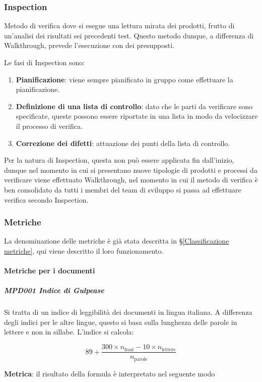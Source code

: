 		\subsubsection{Inspection}
		Metodo di verifica dove si esegue una lettura mirata dei prodotti, frutto di un'analisi dei risultati sei precedenti test. Questo metodo dunque, a differenza di Walkthrough, prevede l'esecuzione con dei presupposti.

		Le fasi di Inspection sono:

		\begin{enumerate}
			\item \textbf{Pianificazione}: viene sempre pianificato in gruppo come effettuare la pianificazione.
			\item \textbf{Definizione di una lista di controllo}: dato che le parti da verificare sono specificate, queste possono essere riportate in una lista in modo da velocizzare il processo di verifica.
			\item \textbf{Correzione dei difetti}: attuazione dei punti della lista di controllo.
		\end{enumerate}

	Per la natura di Inspection, questa non può essere applicata fin dall'inizio, dunque nel momento in cui si presentano nuove tipologie di prodotti e processi da verificare viene effettuato Walkthrough, nel momento in cui il metodo di verifica è ben consolidato da tutti i membri del team di sviluppo si passa ad effettuare verifica secondo Inspection.

		\subsubsection{Metriche}
		La denominazione delle metriche è già stata descritta in \S\ref{Classificazione metriche}, qui viene descritto il loro funzionamento.
			\paragraph{Metriche per i documenti}
				\subparagraph{MPD001 Indice di Gulpease}
				Si tratta di un indice di leggibilità dei documenti in lingua italiana. A differenza degli indici per le altre lingue, questo si basa sulla
				lunghezza delle parole in lettere e non in sillabe. L'indice si calcola:

				\[89+\dfrac{300\times n_{\text{frasi}}-10\times n_{\text{lettere}}}{n_{\text{parole}}}\]

				\textbf{Metrica}: il risultato della formula è interpretato nel seguente modo

